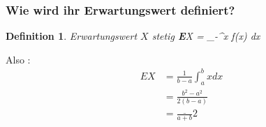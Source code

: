 \documentclass{article}
\newtheorem{definition}{Definition}[section]
\begin{document}
			
		\subsubsection*{Wie wird ihr Erwartungswert definiert?}
			\begin{definition}{Erwartungswert $X$ stetig}
				\textbf{E}X = \int_{-\infty}^{\infty}x \dot f(x) dx
			\end{definition}
		Also :
			\begin{align*}
				EX &= \frac{1}{b-a}\int_{a}^{b}xdx \\ &= \frac{b^2 - a^2}{2(b-a)}\\ &= \frac_{a+b}{2}
			\end{align*}
\end{document}
